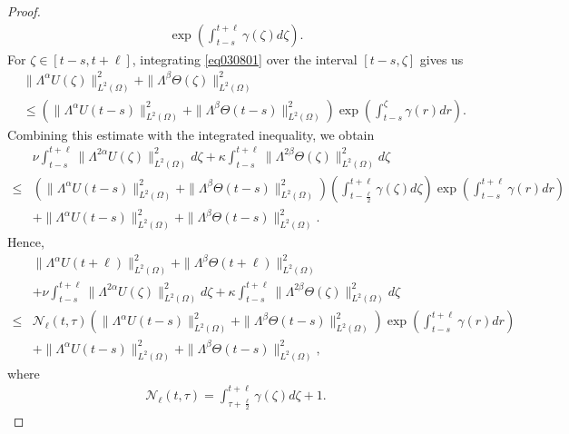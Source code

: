 \documentclass[oneside,preprint,12pt,numbers,sort&compress]{elsarticle}
\begin{document}
\begin{proof}
\begin{align*}
\exp \left(\int_{t-s}^{t+\ell}
\gamma(\zeta) d\zeta \right).
\end{align*}
For $\zeta \in [t-s,t+\ell]$, integrating \cref{eq030801} over the interval $[t-s,\zeta]$ gives us
\begin{align*}
&\| \Lambda^{\alpha}U(\zeta) \|_{L^2(\Omega)}^{2} 
+ \| \Lambda^{\beta}\Theta (\zeta) \|_{L^2(\Omega)}^{2} \\
&\leq
\left( \| \Lambda^{\alpha}U(t-s) \|_{L^2(\Omega)}^{2} 
+ \| \Lambda^{\beta}\Theta (t-s) \|_{L^2(\Omega)}^{2} \right)
\exp\left(\int_{t-s}^{\zeta}
\gamma(r) dr\right).
\end{align*}
Combining this estimate with the integrated inequality, we obtain
\begin{align*}
&\nu \int_{t-s}^{t+\ell} \| \Lambda^{2\alpha} U(\zeta) \|_{L^2(\Omega)}^{2} d\zeta
+\kappa \int_{t-s}^{t+\ell} \| \Lambda^{2\beta} \Theta (\zeta) \|_{L^2(\Omega)}^{2} d\zeta
\\
\leq
&\left( \| \Lambda^{\alpha}U(t-s) \|_{L^2(\Omega)}^{2} 
+ \| \Lambda^{\beta}\Theta (t-s) \|_{L^2(\Omega)}^{2} \right)
\left( \int_{t-\frac{\ell}{2}}^{t+\ell} \gamma(\zeta) d\zeta \right)
\exp \left(\int_{t-s}^{t+\ell}
\gamma(r) dr \right) \\
&+ \| \Lambda^{\alpha}U(t-s) \|_{L^2(\Omega)}^{2} 
+ \| \Lambda^{\beta}\Theta (t-s) \|_{L^2(\Omega)}^{2}.
\end{align*}
Hence, 
\begin{equation}\label{eq030802}
\begin{aligned}
&
\| \Lambda^{\alpha}U(t+\ell) \|_{L^2(\Omega)}^{2} 
+ \| \Lambda^{\beta}\Theta (t+\ell) \|_{L^2(\Omega)}^{2} \\
& +\nu \int_{t-s}^{t+\ell} \| \Lambda^{2\alpha} U(\zeta) \|_{L^2(\Omega)}^{2} d\zeta
+\kappa \int_{t-s}^{t+\ell} \| \Lambda^{2\beta} \Theta (\zeta) \|_{L^2(\Omega)}^{2} d\zeta
\\
\leq
& \mathcal{N}_{\ell}(t,\tau) \left( \| \Lambda^{\alpha}U(t-s) \|_{L^2(\Omega)}^{2} 
+ \| \Lambda^{\beta}\Theta (t-s) \|_{L^2(\Omega)}^{2} \right)
\exp \left(\int_{t-s}^{t+\ell}
\gamma(r) dr \right) \\
&+ \| \Lambda^{\alpha}U(t-s) \|_{L^2(\Omega)}^{2} 
+ \| \Lambda^{\beta}\Theta (t-s) \|_{L^2(\Omega)}^{2},
\end{aligned}
\end{equation}
where
\begin{align*}
\mathcal{N}_{\ell}(t,\tau) = \int_{\tau+\frac{\ell}{2}}^{t+\ell} \gamma(\zeta) d\zeta + 1.
\end{align*}

\end{proof}
\end{document}
